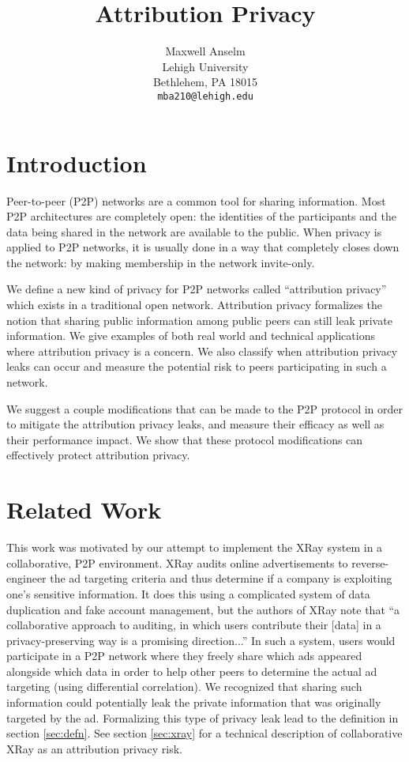 \documentclass{article}
\title{Attribution Privacy}
\author{
Maxwell Anselm\\
Lehigh University\\
Bethlehem, PA 18015\\
\texttt{mba210@lehigh.edu}\\
}
\newcommand{\secref}[1]{section \ref{sec:#1}}
\begin{document}
\maketitle

\section{Introduction}

Peer-to-peer (P2P) networks are a common tool for sharing information. Most P2P
architectures are completely open: the identities of the participants and the
data being shared in the network are available to the public. When privacy is
applied to P2P networks, it is usually done in a way that completely closes down
the network: by making membership in the network invite-only\cite{privatep2p}.

We define a new kind of privacy for P2P networks called ``attribution privacy''
which exists in a traditional open network. Attribution privacy formalizes
the notion that sharing public information among public peers can still leak
private information. We give examples of both real world and technical
applications where attribution privacy is a concern. We also classify when
attribution privacy leaks can occur and measure the potential risk to peers
participating in such a network.

We suggest a couple modifications that can be made to the P2P protocol in order
to mitigate the attribution privacy leaks, and measure their efficacy as well as
their performance impact. We show that these protocol modifications can effectively
protect attribution privacy.

\section{Related Work}\label{sec:relwork}

This work was motivated by our attempt to implement the XRay
system\cite{xray} in a collaborative, P2P environment. XRay audits online
advertisements to reverse-engineer the ad targeting criteria and thus determine
if a company is exploiting one's sensitive information. It does this using a
complicated system of data duplication and fake account management, but the
authors of XRay note that ``a collaborative approach to auditing, in which users
contribute their [data] in a privacy-preserving way is a promising
direction...'' In such a system, users would participate in a P2P network where
they freely share which ads appeared alongside which data in order to help other
peers to determine the actual ad targeting (using differential correlation).
We recognized that sharing such information could potentially leak the private
information that was originally targeted by the ad. Formalizing this type of
privacy leak lead to the definition in \secref{defn}. See \secref{xray} for a
technical description of collaborative XRay as an attribution privacy risk.
\end{document}

